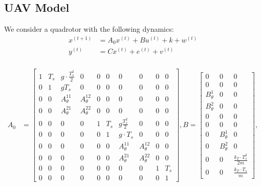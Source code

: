 \documentclass[journal]{IEEEtran}
\begin{document}
\subsection{UAV Model}
We consider a quadrotor with the following dynamics:
\begin{equation}
\begin{aligned}
x^{(t+1)} &= A_0 x^{(t)} + B u^{(t)}  + k + w^{(t)} \\
y^{(t)} &= C x^{(t)} + e^{(t)} + v^{(t)} \\
\end{aligned}
\end{equation}
\begin{figure*}
\begin{equation}
\begin{aligned}
A_0 &= \begin{bmatrix} 1 & T_s &  g \cdot \frac {T_s^2} {2} & 0 		& 0 & 0 & 0 & 0 	& 0 &   0 \\
			      0 & 1 & g T_s & 0 				& 0 & 0 & 0 & 0 	& 0 &   0 \\
			      0 & 0 & A_\theta^{11} & A_\theta^{12} 			& 0 & 0 & 0 & 0 	& 0 &   0 \\
			      0 & 0 & A_\theta^{21} & A_\theta^{22}  			& 0 & 0 & 0 & 0 	& 0 &   0 \\
			      0 & 0 & 0 & 0 & 1 & T_s &  g\frac{T_s^2} {2} & 0	& 0 & 0 \\
			      0 & 0 & 0 & 0 & 0 & 1 & g \cdot T_s & 0  & 0 & 0 \\
			      0 & 0 & 0 & 0 & 0 & 0 &  A_\theta^{11} & A_\theta^{12} & 0 & 0 \\
			      0 & 0 & 0 & 0 & 0 & 0 &  A_\theta^{21} & A_\theta^{22}  & 0 & 0 \\
			      0 & 0 & 0 & 0 & 0 & 0 & 0 & 0 & 1 & T_s \\
			      0 & 0 & 0 & 0 & 0 & 0 & 0 & 0 & 0 & 1
	\end{bmatrix}, 
B = \begin{bmatrix}  
				0	& 	0	& 	0 \\
				0	& 	0	& 	0 \\
				B_\theta^1 & 0 & 0 \\
				B_\theta^2 & 0 & 0 \\
				0	& 	0	& 	0 \\
				0	& 	0	& 	0 \\
				0 &  B_\theta^1  & 0 \\
				0 &  B_\theta^2  & 0 \\
				0 & 0 & \frac {k_T \cdot T_s^2} {2m} \\
				0 & 0 & \frac {k_T \cdot T_s} {m}
	\end{bmatrix}, \\
\end{aligned}
\end{equation}
\end{figure*}
\end{document}
